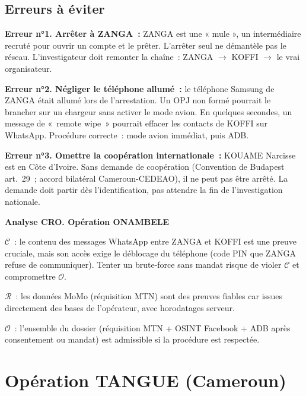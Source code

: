 \subsection{Erreurs à éviter}

\begin{boxalert}
\textbf{Erreur n°1. Arrêter à ZANGA~:} ZANGA est une « mule », un
intermédiaire recruté pour ouvrir un compte et le prêter. L'arrêter seul
ne démantèle pas le réseau. L'investigateur doit remonter la chaîne~:
ZANGA $\to$ KOFFI $\to$ le vrai organisateur.

\textbf{Erreur n°2. Négliger le téléphone allumé~:} le téléphone
Samsung de ZANGA était allumé lors de l'arrestation. Un OPJ non formé
pourrait le brancher sur un chargeur sans activer le mode avion. En
quelques secondes, un message de «~remote wipe~» pourrait effacer les
contacts de KOFFI sur WhatsApp. Procédure correcte~: mode avion
immédiat, puis ADB.

\textbf{Erreur n°3. Omettre la coopération internationale~:}
KOUAME Narcisse est en Côte d'Ivoire. Sans demande de coopération
(Convention de Budapest art.~29~; accord bilatéral Cameroun-CEDEAO),
il ne peut pas être arrêté. La demande doit partir dès l'identification,
pas attendre la fin de l'investigation nationale.
\end{boxalert}

\begin{boxCRO}
\textbf{Analyse CRO. Opération ONAMBELE}

$\mathcal{C}$~: le contenu des messages WhatsApp entre ZANGA et KOFFI
est une preuve cruciale, mais son accès exige le déblocage du téléphone
(code PIN que ZANGA refuse de communiquer). Tenter un brute-force sans
mandat risque de violer $\mathcal{C}$ et compromettre $\mathcal{O}$.

$\mathcal{R}$~: les données MoMo (réquisition MTN) sont des preuves
fiables car issues directement des bases de l'opérateur, avec horodatages
serveur.

$\mathcal{O}$~: l'ensemble du dossier (réquisition MTN + OSINT Facebook
+ ADB après consentement ou mandat) est admissible si la procédure est
respectée.

\end{boxCRO}

\section{Opération TANGUE (Cameroun)}
\label{sec:tangue}

